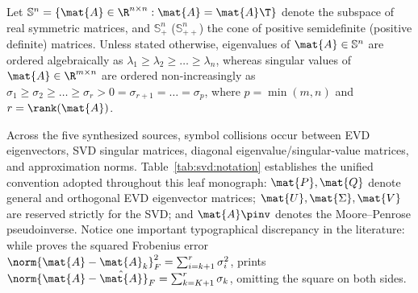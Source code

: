 \documentclass[../../../../master.tex]{subfiles}
\begin{document}
Let $\mathbb{S}^n = \{\mat{A} \in \R^{n \times n} : \mat{A} = \mat{A}\T\}$ denote the subspace of real symmetric matrices, and $\mathbb{S}_+^n$ ($\mathbb{S}_{++}^n$) the cone of positive semidefinite (positive definite) matrices. Unless stated otherwise, eigenvalues of $\mat{A} \in \mathbb{S}^n$ are ordered algebraically as $\lambda_1 \ge \lambda_2 \ge \dots \ge \lambda_n$, whereas singular values of $\mat{A} \in \R^{m \times n}$ are ordered non-increasingly as $\sigma_1 \ge \sigma_2 \ge \dots \ge \sigma_r > 0 = \sigma_{r+1} = \dots = \sigma_p$, where $p = \min(m,n)$ and $r = \rank(\mat{A})$.

\begin{crossbook}
Across the five synthesized sources, symbol collisions occur between EVD eigenvectors, SVD singular matrices, diagonal eigenvalue/singular-value matrices, and approximation norms. Table~\ref{tab:svd:notation} establishes the unified convention adopted throughout this leaf monograph: $\mat{P}, \mat{Q}$ denote general and orthogonal EVD eigenvector matrices; $\mat{U}, \mat{\Sigma}, \mat{V}$ are reserved strictly for the SVD; and $\mat{A}\pinv$ denotes the Moore--Penrose pseudoinverse. Notice one important typographical discrepancy in the literature: while  proves the squared Frobenius error $\norm{\mat{A}-\mat{A}_k}_F^2 = \sum_{i=k+1}^r \sigma_i^2$,  prints $\norm{\mat{A}-\hat{\mat{A}}}_F = \sum_{k=K+1}^r \sigma_k$, omitting the square on both sides.
\end{crossbook}
\end{document}
